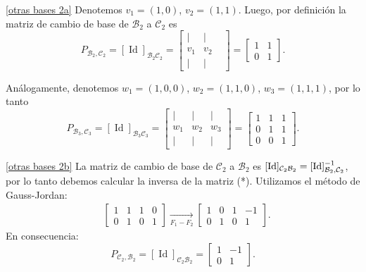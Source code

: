 \begin{enumerate}[topsep=6pt, itemsep=.4cm]
\rta

\ref{otras bases 2a} Denotemos  $v_1 = (1, 0)$, $v_2=(1 ,1)$. 
Luego, por definición la matriz de cambio de base  de  $\mathcal B_2$ a $\mathcal C_2$ es
    \begin{equation*}
        P_{{\mathcal{B}_2},{\mathcal{C}_2}}=  [\operatorname{Id}]_{\mathcal B_2\mathcal C_2} =
        \begin{bmatrix}  \mid & \mid\\ v_1 & v_2\\ \mid & \mid &\end{bmatrix} =
        \begin{bmatrix}
        1&1 \\
        0&1\end{bmatrix}. \tag{*}
    \end{equation*}

Análogamente, denotemos  $w_1 = (1, 0,0)$, $w_2=(1 ,1,0)$, $w_3=(1 ,1,1)$, por lo tanto
    \begin{equation*}
        P_{{\mathcal{B}_3},{\mathcal{C}_3}}=  [\operatorname{Id}]_{\mathcal B_3\mathcal C_3} =
        \begin{bmatrix}  \mid & \mid & \mid\\ w_1 & w_2 & w_3\\ \mid & \mid & \mid \end{bmatrix} =
        \begin{bmatrix}
        1&1&1 \\
        0&1&1\\
        0&0&1\end{bmatrix}. \tag{**}
    \end{equation*}

\ref{otras bases 2b} La matriz de cambio de base  de  $\mathcal C_2$ a $\mathcal B_2$ es $[\operatorname{Id}]_{\mathcal C_2\mathcal B_2} = [\operatorname{Id}]_{{\mathcal{B}_2},{\mathcal{C}_2}}^{-1}$, por lo tanto debemos calcular la inversa de la matriz (*). Utilizamos el método de Gauss-Jordan:
\begin{align*}
    &\left[\begin{array}{cc|cc}
    1&1&1&0\\0&1&0&1
    \end{array}\right] \underset{F_1-F_2}{\longrightarrow} \left[\begin{array}{cc|cc}
    1&0&1&-1\\0&1&0&1
    \end{array}\right].
\end{align*}
En  consecuencia:
    \begin{equation*}
        P_{{\mathcal{C}_2},{\mathcal{B}_2}}=  [\operatorname{Id}]_{\mathcal C_2\mathcal B_2} =
        \begin{bmatrix}
        1&-1 \\
        0&1\end{bmatrix}. 
    \end{equation*}
    

\end{enumerate}
